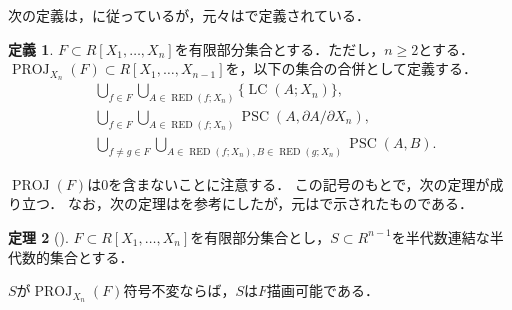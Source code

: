 \documentclass[uplatex, dvipdfmx]{jsarticle}
\numberwithin{equation}{section}
\DeclareMathOperator{\PSC}{PSC}
\DeclareMathOperator{\RED}{RED}
\DeclareMathOperator{\LC}{LC}
\DeclareMathOperator{\PROJ}{PROJ}
\theoremstyle{definition}
\newtheorem{definition}{定義}[section]
\newtheorem{theorem}[definition]{定理}
\begin{document}
次の定義は，\cite[Section 3]{MR0764184}に従っているが，元々は\cite[Section 2]{MR0403962}で定義されている．
\begin{definition}
$F \subset R[X_1, \dots, X_n]$を有限部分集合とする．ただし，$n \geq 2$とする．
$\PROJ_{X_n}(F) \subset R[X_1, \dots, X_{n-1}]$を，以下の集合の合併として定義する．
\begin{align} 
     &  \bigcup_{f \in F} \bigcup_{A \in \RED(f;X_n)} \{\LC(A;X_n)\},\\
     &  \bigcup_{f \in F} \bigcup_{A \in \RED(f;X_n)} \PSC(A, \partial A / \partial X_n),\\
     &  \bigcup_{f \neq g \in F} \bigcup_{A \in \RED(f;X_n), B \in \RED(g;X_n)} \PSC(A,B).
\end{align}
\end{definition}

$\PROJ(F)$は$0$を含まないことに注意する．
この記号のもとで，次の定理が成り立つ．
なお，次の定理は\cite[Theorem 4]{MR0764184}を参考にしたが，元は\cite[Theorem 5]{MR0403962}で示されたものである．

\begin{theorem}[{\cite[Theorem 4]{MR0764184}}]\label{theorem:inv-deline}
$F \subset R[X_1, \dots, X_n]$を有限部分集合とし，$S \subset R^{n-1}$を半代数連結な半代数的集合とする．

$S$が$\PROJ_{X_n}(F)$符号不変ならば，$S$は$F$描画可能である．
\end{theorem}
\end{document}

